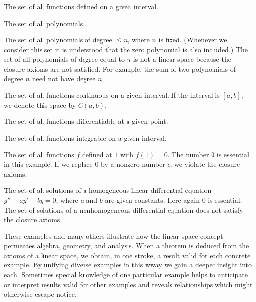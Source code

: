 \documentclass[cn,11pt,chinese]{elegantbook}
\numberwithin{equation}{section}
\begin{document}
\begin{example}\label{exam020010305}
The set of all functions defined on a given interval.
\end{example}

\begin{example}\label{exam020010306}
The set of all polynomials.
\end{example}

\begin{example}\label{exam020010307}
The set of all polynomials of degree $\le n$, where $n$ is fixed. (Whenever we consider this set it is understood that the zero polynomial is also included.) The set of all polynomials of degree equal to $n$ is not a linear space because the closure axioms are not satisfied. For example, the sum of two polynomials of degree $n$ need not have degree $n$.
\end{example}

\begin{example}\label{exam020010308}
The set of all functions continuous on a given interval. If the interval is $[a, b]$, we denote this space by $C(a, b)$.
\end{example}

\begin{example}\label{exam020010309}
The set of all functions differentiable at a given point.
\end{example}

\begin{example}\label{exam020010310}
The set of all functions integrable on a given interval.
\end{example}

\begin{example}\label{exam020010311}
The set of all functions $f$ defined at $1$ with $f(1)=0$. The number $0$ is essential in this example. If we replace $0$ by a nonzero number $c$, we violate the closure axioms.
\end{example}

\begin{example}\label{exam020010312}
The set of all solutions of a homogeneous linear differential equation $y'' + ay' + by = 0$, where $a$ and $b$ are given constants. Here again $0$ is essential. The set of solutions of a nonhomogeneous differential equation does not satisfy the closure axioms.
\end{example}

These examples and many others illustrate how the linear space concept permeates algebra, geometry, and analysis. When a theorem is deduced from the axioms of a linear space, we obtain, in one stroke, a result valid for each concrete example. By unifying diverse examples in this wway we gain a deeper insight into each. Sometimes special knowledge of one particular example helps to anticipate or interpret results valid for other examples and reveals relationships which might otherwise escape notice.
\end{document}
